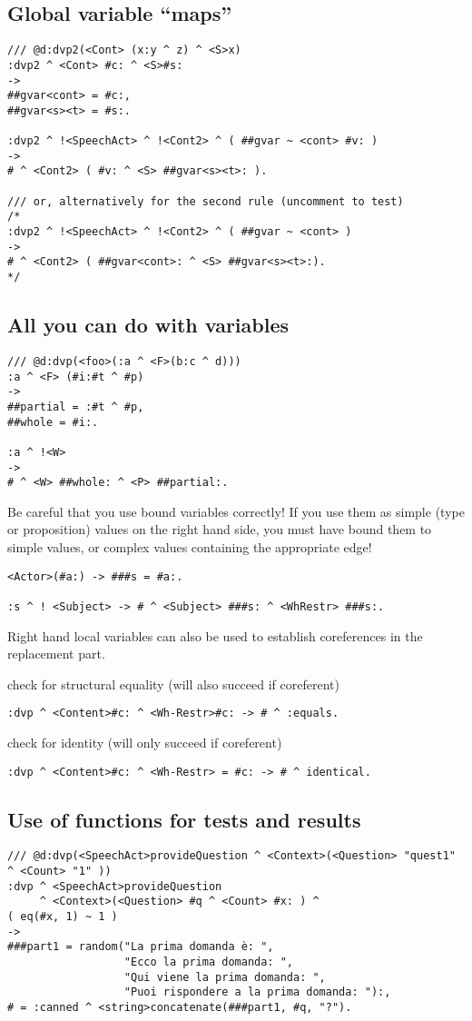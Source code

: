 \subsection{
 Global variable ``maps''
}
\begin{verbatim}
/// @d:dvp2(<Cont> (x:y ^ z) ^ <S>x)
:dvp2 ^ <Cont> #c: ^ <S>#s:
->
##gvar<cont> = #c:,
##gvar<s><t> = #s:.

:dvp2 ^ !<SpeechAct> ^ !<Cont2> ^ ( ##gvar ~ <cont> #v: )
->
# ^ <Cont2> ( #v: ^ <S> ##gvar<s><t>: ).

/// or, alternatively for the second rule (uncomment to test)
/*
:dvp2 ^ !<SpeechAct> ^ !<Cont2> ^ ( ##gvar ~ <cont> )
->
# ^ <Cont2> ( ##gvar<cont>: ^ <S> ##gvar<s><t>:).
*/
\end{verbatim}

\subsection{
 All you can do with variables
}
\begin{verbatim}
/// @d:dvp(<foo>(:a ^ <F>(b:c ^ d)))
:a ^ <F> (#i:#t ^ #p)
->
##partial = :#t ^ #p,
##whole = #i:.

:a ^ !<W>
->
# ^ <W> ##whole: ^ <P> ##partial:.
\end{verbatim}
Be careful that you use bound variables correctly! If you use them as simple
(type or proposition) values on the right hand side, you must have bound them
to simple values, or complex values containing the appropriate edge!
\begin{verbatim}
<Actor>(#a:) -> ###s = #a:.

:s ^ ! <Subject> -> # ^ <Subject> ###s: ^ <WhRestr> ###s:.
\end{verbatim}

Right hand local variables can also be used to establish coreferences in the
replacement part.

check for structural equality (will also succeed if coreferent)
\begin{verbatim}
:dvp ^ <Content>#c: ^ <Wh-Restr>#c: -> # ^ :equals.
\end{verbatim}

check for identity (will only succeed if coreferent)
\begin{verbatim}
:dvp ^ <Content>#c: ^ <Wh-Restr> = #c: -> # ^ identical.
\end{verbatim}

\subsection{
 Use of functions for tests and results
}

\begin{verbatim}
/// @d:dvp(<SpeechAct>provideQuestion ^ <Context>(<Question> "quest1" ^ <Count> "1" ))
:dvp ^ <SpeechAct>provideQuestion
     ^ <Context>(<Question> #q ^ <Count> #x: ) ^
( eq(#x, 1) ~ 1 )
->
###part1 = random("La prima domanda è: ",
                  "Ecco la prima domanda: ",
                  "Qui viene la prima domanda: ",
                  "Puoi rispondere a la prima domanda: "):,
# = :canned ^ <string>concatenate(###part1, #q, "?").
\end{verbatim}

